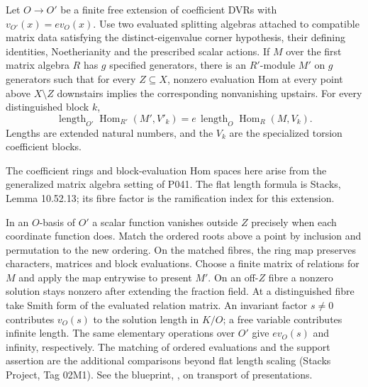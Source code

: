 \begin{formalstatement}\label{pn:P042}
Let \(O\to O'\) be a finite free extension of coefficient DVRs with \(v_{O'}(x)=e v_O(x)\). Use two evaluated splitting algebras attached to compatible matrix data satisfying the distinct-eigenvalue corner hypothesis, their defining identities, Noetherianity and the prescribed scalar actions. If \(M\) over the first matrix algebra \(R\) has \(g\) specified generators, there is an \(R'\)-module \(M'\) on \(g\) generators such that for every \(Z\subseteq X\), nonzero evaluation Hom at every point above \(X\setminus Z\) downstairs implies the corresponding nonvanishing upstairs. For every distinguished block \(k\),
\[
 \operatorname{length}_{O'}\operatorname{Hom}_{R'}(M',V'_k)
   = e\,\operatorname{length}_{O}\operatorname{Hom}_{R}(M,V_k).
\]
Lengths are extended natural numbers, and the \(V_k\) are the specialized torsion coefficient blocks.
\end{formalstatement}
The coefficient rings and block-evaluation Hom spaces here arise from the generalized matrix algebra setting of P041. The flat length formula is Stacks, Lemma 10.52.13; its fibre factor is the ramification index for this extension.
\begin{outline}
In an \(O\)-basis of \(O'\) a scalar function vanishes outside \(Z\) precisely when each coordinate function does. Match the ordered roots above a point by inclusion and permutation to the new ordering. On the matched fibres, the ring map preserves characters, matrices and block evaluations. Choose a finite matrix of relations for \(M\) and apply the map entrywise to present \(M'\). On an off-\(Z\) fibre a nonzero solution stays nonzero after extending the fraction field. At a distinguished fibre take Smith form of the evaluated relation matrix. An invariant factor \(s\ne0\) contributes \(v_O(s)\) to the solution length in \(K/O\); a free variable contributes infinite length. The same elementary operations over \(O'\) give \(e v_O(s)\) and infinity, respectively. The matching of ordered evaluations and the support assertion are the additional comparisons beyond flat length scaling (Stacks Project, Tag 02M1). See the blueprint, , on transport of presentations.
\end{outline}
